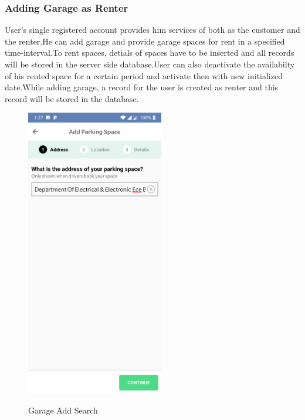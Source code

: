 \documentclass[12pt, english]{article}
\begin{document}
\subsubsection{Adding Garage as Renter}
User's single registered account provides him services of both as the customer and the renter.He can add garage and provide garage spaces for rent in a specified time-interval.To rent spaces, detials of spaces have to be inserted and all records will be stored in the server side database.User can also deactivate the availabilty of his rented space for a certain period and activate then with new initialized date.While adding garage, a record for the user is created as renter and this record will be stored in the database.
\newpage
\begin{figure}[h!]
        \begin{minipage}[b]{1\linewidth}
        \centering
        \includegraphics[width=6cm]{GarageAdd/AddressFragment1.jpg}
        \label{arch6}
        \caption{Garage Add Search}
        \end{minipage}
\end{figure}
\end{document}
